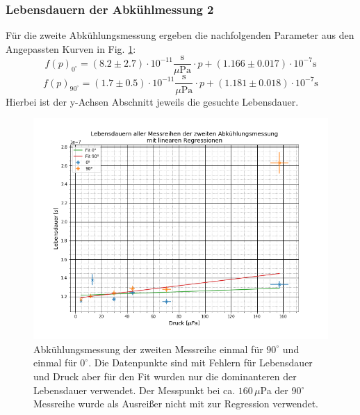 \subsubsection{Lebensdauern der Abkühlmessung 2}
Für die zweite Abkühlungsmessung ergeben die nachfolgenden Parameter aus den Angepassten Kurven in Fig. \ref{Abk2}:
\begin{equation*}
f(p)_{0^\circ}=(8.2\pm 2.7)\cdot 10^{-11} \frac{\text{s}}{\text{$\mu$Pa}}\cdot p + (1.166\pm 0.017)\cdot 10^{-7} \text{s}
\end{equation*}
\begin{equation*}
f(p)_{90^\circ}=(1.7\pm 0.5)\cdot 10^{-11} \frac{\text{s}}{\text{$\mu$Pa}}\cdot p + (1.181\pm 0.018)\cdot 10^{-7} \text{s}
\end{equation*}
Hierbei ist der y-Achsen Abschnitt jeweils die gesuchte Lebensdauer.
\begin{figure}[ht]
	\includegraphics[scale=0.5]{Bild/Abk2}
	\centering
	\caption[Druck zu Lebensdauer Fit für Abkühlung 2]{Abkühlungsmessung der zweiten Messreihe einmal für $90^\circ$ und einmal für $0^\circ$. Die Datenpunkte sind mit Fehlern für Lebensdauer und Druck aber für den Fit wurden nur die dominanteren der Lebensdauer verwendet. Der Messpunkt bei ca. $160\,\mu$Pa der 90$^\circ$ Messreihe wurde als Ausreißer nicht mit zur Regression verwendet.}
	\label{Abk2}
\end{figure}
\FloatBarrier
